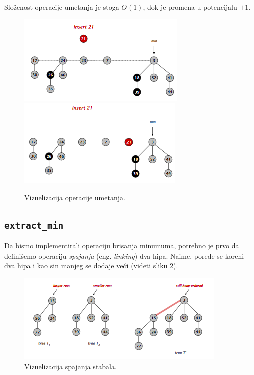 \documentclass[a4paper]{article}
\theoremstyle{plain}
\theoremstyle{definition}
\begin{document}
Slo\v{z}enost operacije umetanja je stoga $O(1)$, dok je promena u potencijalu $+1$.

\begin{figure}[H]
    \centering
    \includegraphics[scale=0.7]{resources/fig2a.PNG}\\
    \includegraphics[scale=0.7]{resources/fig2b.PNG}
    \caption{Vizuelizacija operacije umetanja.}
    \label{fig2}
\end{figure}


\subsection{\texttt{extract\_min}}
\label{subsec:extractmin}

Da bismo implementirali operaciju brisanja minumuma, potrebno je prvo da defini\v{s}emo operaciju \emph{spajanja} (eng. \emph{linking}) dva hipa. Naime, porede se koreni dva hipa i kao sin manjeg se dodaje ve\'c{}i (videti sliku \ref{fig3}).

\begin{figure}[H]
    \centering
    \includegraphics[scale=0.7]{resources/fig3.PNG}
    \caption{Vizuelizacija spajanja stabala.}
    \label{fig3}
\end{figure}
\end{document}
